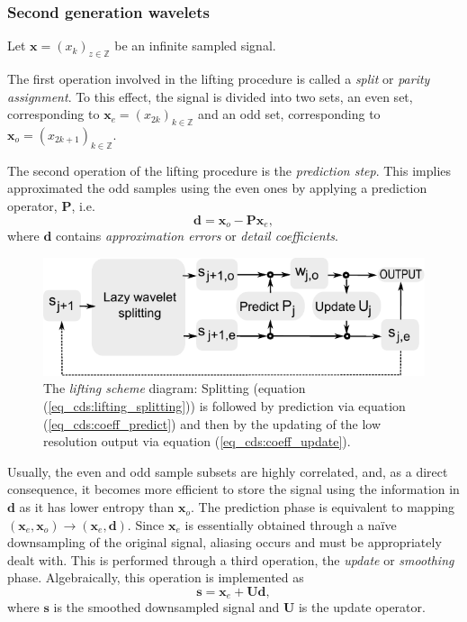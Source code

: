 \documentclass[graybox]{svmult}
\begin{document}

\subsubsection{Second generation wavelets}
Let $\mathbf{x} = (x_k)_{z\in \mathbb{Z}}$ be an infinite sampled signal.

The first operation involved in the lifting procedure is called a \emph{split} or \emph{parity assignment}. To this effect, the signal is divided into two sets, an even set, corresponding to $\mathbf{x}_e = (x_{2k})_{k\in \mathbb{Z}}$ and an odd set, corresponding to $\mathbf{x}_o = (x_{2k+1})_{k\in\mathbb{Z}}$.

The second operation of the lifting procedure is the \emph{prediction step}. This implies approximated the odd samples using the even ones by applying a prediction operator, $\mathbf{P}$, i.e.
\begin{equation}
\mathbf{d} = \mathbf{x}_o - \mathbf{P} \mathbf{x}_e,
\end{equation}
where $\mathbf{d}$ contains \emph{approximation errors} or \emph{detail coefficients}.


\begin{figure}[h]
	\centering
	\includegraphics[width=\textwidth]{lifting_diagram}
	\caption{The \emph{lifting scheme} diagram: Splitting (equation (\ref{eq_cds:lifting_splitting})) is followed by prediction via equation (\ref{eq_cds:coeff_predict}) and then by the updating of the low resolution output via equation (\ref{eq_cds:coeff_update}).}
	\label{fig_cds:lifting_diagram}
\end{figure}


Usually, the even and odd sample subsets are highly correlated, and, as a direct consequence, it becomes more efficient to store the signal using the information in $\mathbf{d}$ as it has lower entropy than $\mathbf{x}_o$. The prediction phase is equivalent to mapping $(\mathbf{x}_e, \mathbf{x}_o) \to (\mathbf{x}_e, \mathbf{d})$. Since $\mathbf{x}_e$ is essentially obtained through a na\"ive downsampling of the original signal, aliasing occurs and must be appropriately dealt with. This is performed through a third operation, the \emph{update} or \emph{smoothing} phase. Algebraically, this operation is implemented as
\begin{equation}
\mathbf{s} = \mathbf{x}_e + \mathbf{U}\mathbf{d},
\end{equation}
where $\mathbf{s}$ is the smoothed downsampled signal and $\mathbf{U}$ is the update operator. 
\end{document}
